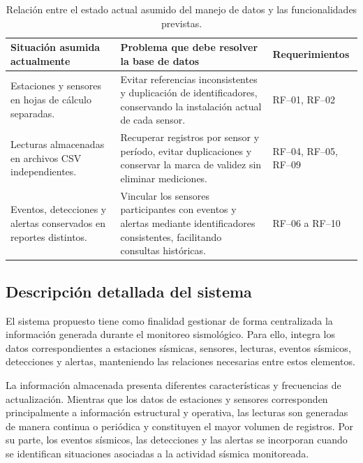 \documentclass[12pt,a4paper]{article}
\begin{document}
\begin{table}[H]
\centering
\small
\begin{tabular}{>{\raggedright\arraybackslash}p{3.9cm} >{\raggedright\arraybackslash}p{6.2cm} >{\raggedright\arraybackslash}p{3.0cm}}
\toprule
\textbf{Situación asumida actualmente} & \textbf{Problema que debe resolver la base de datos} & \textbf{Requerimientos} \\
\midrule
Estaciones y sensores en hojas de cálculo separadas. & Evitar referencias inconsistentes y duplicación de identificadores, conservando la instalación actual de cada sensor. & RF--01, RF--02 \\
Lecturas almacenadas en archivos CSV independientes. & Recuperar registros por sensor y período, evitar duplicaciones y conservar la marca de validez sin eliminar mediciones. & RF--04, RF--05, RF--09 \\
Eventos, detecciones y alertas conservados en reportes distintos. & Vincular los sensores participantes con eventos y alertas mediante identificadores consistentes, facilitando consultas históricas. & RF--06 a RF--10 \\
\bottomrule
\end{tabular}
\caption{Relación entre el estado actual asumido del manejo de datos y las funcionalidades previstas.}
\end{table}


 


\subsection{Descripción detallada del sistema}

El sistema propuesto tiene como finalidad gestionar de forma centralizada la información generada durante el monitoreo sismológico. Para ello, integra los datos correspondientes a estaciones sísmicas, sensores, lecturas, eventos sísmicos, detecciones y alertas, manteniendo las relaciones necesarias entre estos elementos.

La información almacenada presenta diferentes características y frecuencias de actualización. Mientras que los datos de estaciones y sensores corresponden principalmente a información estructural y operativa, las lecturas son generadas de manera continua o periódica y constituyen el mayor volumen de registros. Por su parte, los eventos sísmicos, las detecciones y las alertas se incorporan cuando se identifican situaciones asociadas a la actividad sísmica monitoreada.
\end{document}
